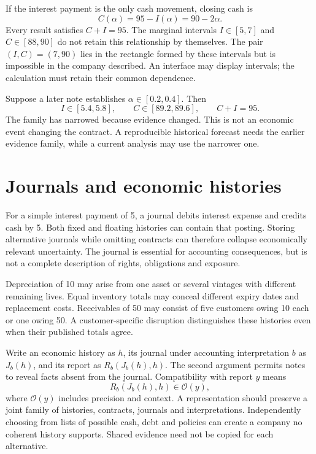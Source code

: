 If the interest payment is the only cash movement, closing cash is
\begin{equation}
 C(\alpha)=95-I(\alpha)=90-2\alpha.\label{sim:cash-family}
\end{equation}
Every result satisfies $C+I=95$. The marginal intervals $I\in[5,7]$ and $C\in[88,90]$ do not retain this relationship by themselves. The pair $(I,C)=(7,90)$ lies in the rectangle formed by these intervals but is impossible in the company described. An interface may display intervals; the calculation must retain their common dependence.

Suppose a later note establishes $\alpha\in[0.2,0.4]$. Then
\begin{equation}
 I\in[5.4,5.8],\qquad C\in[89.2,89.6],\qquad C+I=95.
\end{equation}
The family has narrowed because evidence changed. This is not an economic event changing the contract. A reproducible historical forecast needs the earlier evidence family, while a current analysis may use the narrower one.

\section{Journals and economic histories}
For a simple interest payment of 5, a journal debits interest expense and credits cash by 5. Both fixed and floating histories can contain that posting. Storing alternative journals while omitting contracts can therefore collapse economically relevant uncertainty. The journal is essential for accounting consequences, but is not a complete description of rights, obligations and exposure.

Depreciation of 10 may arise from one asset or several vintages with different remaining lives. Equal inventory totals may conceal different expiry dates and replacement costs. Receivables of 50 may consist of five customers owing 10 each or one owing 50. A customer-specific disruption distinguishes these histories even when their published totals agree.

Write an economic history as $h$, its journal under accounting interpretation $b$ as $J_b(h)$, and its report as $R_b(J_b(h),h)$. The second argument permits notes to reveal facts absent from the journal. Compatibility with report $y$ means
\begin{equation}
 R_b(J_b(h),h)\in\mathcal O(y),\label{sim:compatibility-intro}
\end{equation}
where $\mathcal O(y)$ includes precision and context. A representation should preserve a joint family of histories, contracts, journals and interpretations. Independently choosing from lists of possible cash, debt and policies can create a company no coherent history supports. Shared evidence need not be copied for each alternative.


